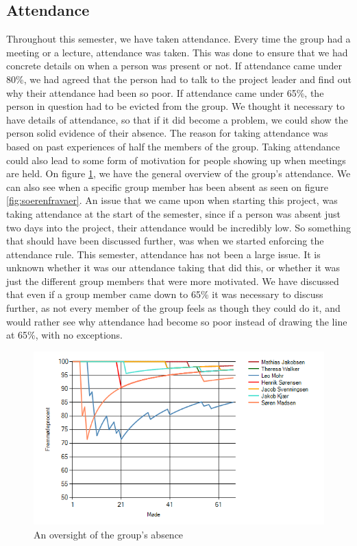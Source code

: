 \documentclass{article}
\begin{document}
\subsection{Attendance}
Throughout this semester, we have taken attendance. 
Every time the group had a meeting or a lecture, attendance was taken. 
This was done to ensure that we had concrete details on when a person was present or not. 
If attendance came under 80\%, we had agreed that the person had to talk to the project leader and find out why their attendance had been so poor. 
If attendance came under 65\%, the person in question had to be evicted from the group. 
We thought it necessary to have details of attendance, so that if it did become a problem, we could show the person solid evidence of their absence. 
The reason for taking attendance was based on past experiences of half the members of the group. 
Taking attendance could also lead to some form of motivation for people showing up when meetings are held.
On figure \ref{fig:GraphImage}, we have the general overview of the group's attendance.
We can also see when a specific group member has been absent as seen on figure \ref{fig:soerenfravaer}.
An issue that we came upon when starting this project, was taking attendance at the start of the semester, since if a person was absent just two days into the project, their attendance would be incredibly low. 
So something that should have been discussed further, was when we started enforcing the attendance rule. 
This semester, attendance has not been a large issue. 
It is unknown whether it was our attendance taking that did this, or whether it was just the different group members that were more motivated.
We have discussed that even if a group member came down to 65\% it was necessary to discuss further, as not every member of the group feels as though they could do it, and would rather see why attendance had become so poor instead of drawing the line at 65\%, with no exceptions.

\begin{figure}
	\centering
	\includegraphics[width=1\textwidth]{figures/GraphImage.png}
	\caption{An oversight of the group's absence}
	\label{fig:GraphImage}
\end{figure}
\end{document}
